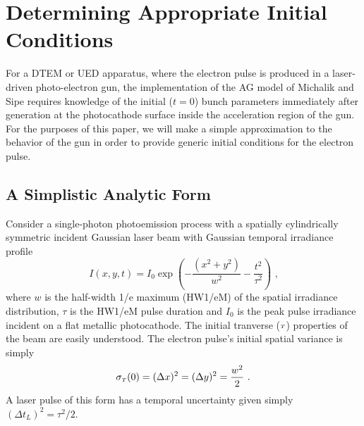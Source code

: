 
\section{Determining Appropriate Initial Conditions} \label{sec:initial_conditions}
For a DTEM or UED apparatus, where the electron pulse is produced in a laser-driven photo-electron gun, the implementation of the AG model of Michalik and Sipe \cite{michalik_analytic_2006} requires knowledge of the initial ($ t = 0 $) bunch parameters immediately after generation at the photocathode surface inside the acceleration region of the gun.
For the purposes of this paper, we will make a simple approximation to the behavior of the gun in order to provide generic initial conditions for the electron pulse.

\subsection{A Simplistic Analytic Form} 

Consider a single-photon photoemission process with a spatially cylindrically symmetric incident Gaussian laser beam with Gaussian temporal irradiance profile 
\begin{equation}\label{eq:laser_form}
I ( x , y , t ) = I_{0} \exp \left ( - \frac{ ( x^{2} +y^{2} ) }{ w^{2} } - \frac{ t^{ 2 } }{ \tau^{ 2 } } \right ) \text{ ,}
\end{equation}
where $w$ is the half-width 1/e maximum (HW1/eM) of the spatial irradiance distribution, $\tau$ is the HW1/eM pulse duration and $I_{0}$ is the peak pulse irradiance incident on a flat metallic photocathode.
The initial tranverse (${\scriptscriptstyle T}$) properties of the beam are easily understood.
The electron pulse's initial spatial variance is simply
\begin{equation}
\sigma_{{\scriptscriptstyle T} } ( 0 ) = ( \Delta x )^{2} = ( \Delta y)^{2} = \frac{ w^{2} }{ 2 } \text{ .}
\end{equation}
A laser pulse of this form has a temporal uncertainty given simply $ ( \Delta t_{L} )^{ 2 } = \tau^{ 2 } / 2 $.

